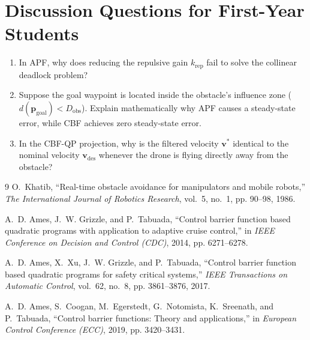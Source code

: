\documentclass[11pt,a4paper]{article}
\begin{document}
\section{Discussion Questions for First-Year Students}
\begin{enumerate}
    \item In APF, why does reducing the repulsive gain $k_{\mathrm{rep}}$ fail to solve the collinear deadlock problem?
    \item Suppose the goal waypoint is located inside the obstacle's influence zone ($d(\mathbf{p}_{\mathrm{goal}}) < D_{\mathrm{obs}}$). Explain mathematically why APF causes a steady-state error, while CBF achieves zero steady-state error.
    \item In the CBF-QP projection, why is the filtered velocity $\mathbf{v}^*$ identical to the nominal velocity $\mathbf{v}_{\mathrm{des}}$ whenever the drone is flying directly away from the obstacle?
\end{enumerate}

\begin{thebibliography}{9}
O.~Khatib, ``Real-time obstacle avoidance for manipulators and mobile robots,'' \emph{The International Journal of Robotics Research}, vol.~5, no.~1, pp. 90--98, 1986.

A.~D. Ames, J.~W. Grizzle, and P.~Tabuada, ``Control barrier function based quadratic programs with application to adaptive cruise control,'' in \emph{IEEE Conference on Decision and Control (CDC)}, 2014, pp. 6271--6278.

A.~D. Ames, X.~Xu, J.~W. Grizzle, and P.~Tabuada, ``Control barrier function based quadratic programs for safety critical systems,'' \emph{IEEE Transactions on Automatic Control}, vol.~62, no.~8, pp. 3861--3876, 2017.

A.~D. Ames, S.~Coogan, M.~Egerstedt, G.~Notomista, K.~Sreenath, and P.~Tabuada, ``Control barrier functions: Theory and applications,'' in \emph{European Control Conference (ECC)}, 2019, pp. 3420--3431.
\end{thebibliography}
\end{document}
